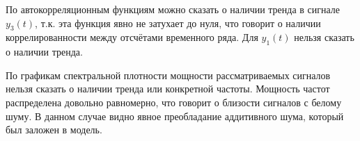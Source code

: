 По автокорреляционным функциям можно сказать о наличии тренда в сигнале $y_3(t)$, т.к. эта функция явно не затухает до нуля, что говорит о наличии коррелированности между отсчётами временного ряда. Для $y_1(t)$ нельзя сказать о наличии тренда.

По графикам спектральной плотности мощности рассматриваемых сигналов нельзя сказать о наличии тренда или конкретной частоты. Мощность частот распределена довольно равномерно, что говорит о близости сигналов с белому шуму. В данном случае видно явное преобладание аддитивного шума, который был заложен в модель.


